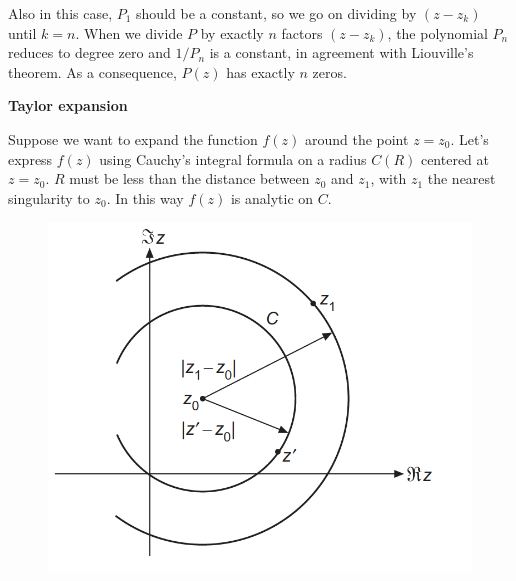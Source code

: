 \documentclass{article}
\begin{document}
\noindent
Also in this case, $P_1$ should be a constant, so we go on dividing by $(z - z_k)$ until $k = n$.
When we divide $P$ by exactly $n$ factors $(z - z_k)$, the polynomial $P_n$ reduces to degree zero and $1 / P_n$ is a constant,
in agreement with Liouville's theorem. As a consequence, $P(z)$ has exactly $n$ zeros.

\vspace{3mm} \noindent
\textbf{Taylor expansion}

\noindent
Suppose we want to expand the function $f(z)$ around the point $z=z_0$. Let’s express $f(z)$ using Cauchy’s integral formula on a radius $C(R)$ centered at $z=z_0$. $R$ must be less than the distance between $z_0$ and $z_1$, with $z_1$ the nearest singularity to $z_0$. In this way $f(z)$ is analytic on $C$.

\begin{figure}[h]
    \centering
    \includegraphics[width=0.35\linewidth]{fig18.png}
\end{figure}
\end{document}
